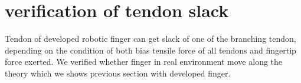 \documentclass{llncs}
\begin{document}
		




\section{verification of tendon slack} %
\label{sec:verification}


Tendon of developed robotic finger can get slack of one of the branching tendon, 
depending on the condition of both bias tensile force of all tendons and fingertip force exerted.
We verified whether finger in real environment move along the theory which we shows previous section with developed finger.
\end{document}
